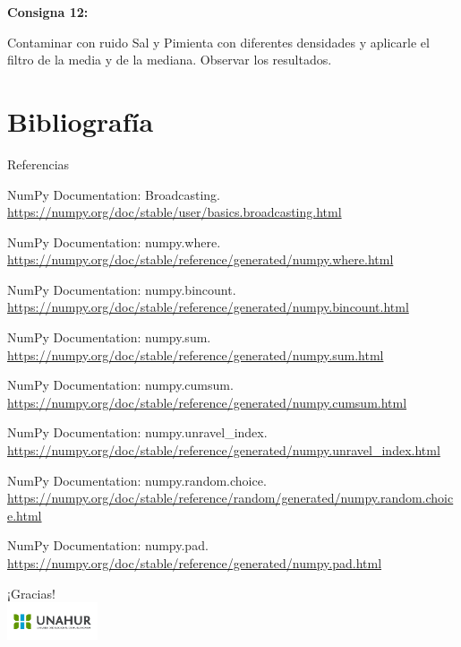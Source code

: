 \documentclass{beamer}
\begin{document}
\begin{frame}
	\begin{center}
		\textcolor{unahurverde}{\textbf{Consigna 12:}}
	\end{center}
	\justifying
	
	 Contaminar con ruido Sal y Pimienta con diferentes densidades y aplicarle el filtro de la media y de la mediana. Observar los resultados.
\end{frame}

\section{Bibliografía}
	
	\begin{frame}{Referencias}
		\tiny
		\begin{thebibliography}{10}
			\beamertemplatebookbibitems
			NumPy Documentation: Broadcasting. 
			\newblock \url{https://numpy.org/doc/stable/user/basics.broadcasting.html}
			
			NumPy Documentation: numpy.where. 
			\newblock \url{https://numpy.org/doc/stable/reference/generated/numpy.where.html}
			
			NumPy Documentation: numpy.bincount. 
			\newblock \url{https://numpy.org/doc/stable/reference/generated/numpy.bincount.html}
			
			NumPy Documentation: numpy.sum. 
			\newblock \url{https://numpy.org/doc/stable/reference/generated/numpy.sum.html}
			
			NumPy Documentation: numpy.cumsum. 
			\newblock \url{https://numpy.org/doc/stable/reference/generated/numpy.cumsum.html}
			
			NumPy Documentation: numpy.unravel\_index. 
			\newblock \url{https://numpy.org/doc/stable/reference/generated/numpy.unravel_index.html}
			
			NumPy Documentation: numpy.random.choice. 
			\newblock \url{https://numpy.org/doc/stable/reference/random/generated/numpy.random.choice.html}
			
			NumPy Documentation: numpy.pad. 
			\newblock \url{https://numpy.org/doc/stable/reference/generated/numpy.pad.html}
		\end{thebibliography}
	\end{frame}
	
	\begin{frame}{}
		\centering
		{\huge ¡Gracias!}\\
		\vspace{1cm}
		\includegraphics[width=0.2\textwidth]{UNAHUR.png}
	\end{frame}
	
\end{document}
